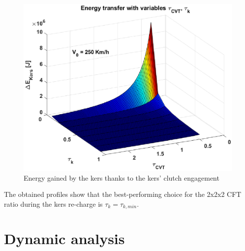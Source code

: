 \documentclass[11pt]{article}
\begin{document}
\begin{figure}[H]
\captionsetup{font=small, justification=centering}
\centering
\includegraphics[width=.7\textwidth]{Images/Results_new/Univariate_SteadyState/en_comp_dec_3D.eps}
\caption{Energy gained by the kers thanks to the kers' clutch engagement}
\label{en_comp_dec_3D}
\end{figure}  

The obtained profiles show that the best-performing choice for the 2x2x2 CFT ratio during the kers re-charge  is $\tau_k=\tau_{k,min}$.

\section{Dynamic analysis}

\newpage
\end{document}
